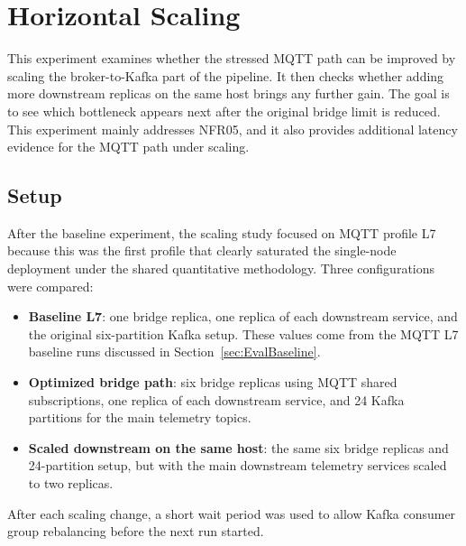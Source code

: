 \section{Horizontal Scaling}
\label{sec:EvalScaling}

This experiment examines whether the stressed \gls{MQTT} path can be improved by scaling the broker-to-Kafka part of the pipeline. It then checks whether adding more downstream replicas on the same host brings any further gain. The goal is to see which bottleneck appears next after the original bridge limit is reduced. This experiment mainly addresses NFR05, and it also provides additional latency evidence for the \gls{MQTT} path under scaling.

\subsection{Setup}
\label{subsec:EvalScalingSetup}

After the baseline experiment, the scaling study focused on \gls{MQTT} profile L7 because this was the first profile that clearly saturated the single-node deployment under the shared quantitative methodology. Three configurations were compared:

\begin{itemize}
    \item \textbf{Baseline L7}: one bridge replica, one replica of each downstream service, and the original six-partition Kafka setup. These values come from the \gls{MQTT} L7 baseline runs discussed in Section~\ref{sec:EvalBaseline}.
    \item \textbf{Optimized bridge path}: six bridge replicas using \gls{MQTT} shared subscriptions, one replica of each downstream service, and 24 Kafka partitions for the main telemetry topics.
    \item \textbf{Scaled downstream on the same host}: the same six bridge replicas and 24-partition setup, but with the main downstream telemetry services scaled to two replicas.
\end{itemize}

After each scaling change, a short wait period was used to allow Kafka consumer group rebalancing before the next run started.

